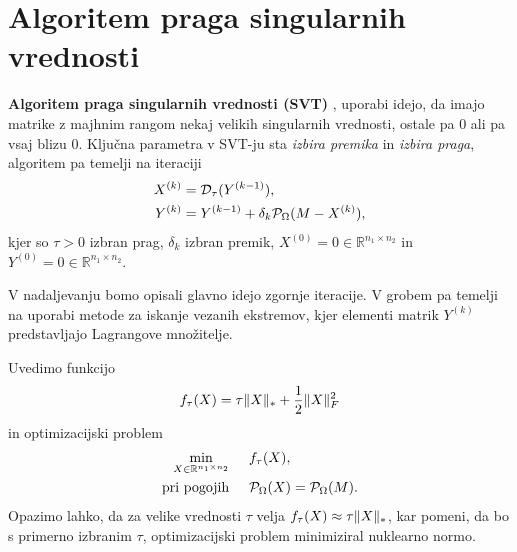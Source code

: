 \section{Algoritem praga singularnih vrednosti}
\textbf{Algoritem praga singularnih vrednosti (SVT)} \cite{CCS}, uporabi idejo, da imajo matrike z majhnim rangom nekaj velikih singularnih vrednosti, ostale pa 0 ali pa vsaj blizu 0. Ključna parametra v SVT-ju sta \textit{izbira premika} in \textit{izbira praga},  
algoritem pa temelji na iteraciji
\begin{align}
\label{2407-1910}
        X^{(k)} &= \mathcal{D}_\tau(Y^{(k-1)}), \\
        Y^{(k)} &= Y^{(k-1)} + \delta_k \mathcal{P}_\Omega(M - X^{(k)}), 
\end{align}
kjer so $\tau > 0$ izbran prag, $\delta_k$ izbran premik, $X^{(0)} = 0 \in \mathbb{R}^{n_1 \times n_2}$ in
$Y^{(0)} = 0 \in \mathbb{R}^{n_1 \times n_2}$. \cite{CCS}

V nadaljevanju bomo opisali glavno idejo zgornje iteracije. V grobem pa temelji na uporabi metode za iskanje vezanih ekstremov, kjer elementi matrik $Y^{(k)}$ predstavljajo Lagrangove množitelje. 

Uvedimo funkcijo 
\begin{align}
    \label{1007-2007}
    f_\tau(X) = \tau\lVert X\rVert_* + \frac{1}{2}\lVert X\rVert_F^2
\end{align}
in optimizacijski problem
\begin{align}
\label{2706-0957}
\begin{split}
    \min_{X\in \mathbb R^{n_1\times n_2}} & \hspace{0.5cm} f_\tau(X), \\
    \textrm{pri pogojih} & \hspace{0.5cm} \mathcal{P}_\Omega(X) = \mathcal{P}_\Omega(M).
\end{split}
\end{align}
Opazimo lahko, da za velike vrednosti $\tau$ velja $f_\tau(X) \approx \tau\lVert X\rVert_*$, kar pomeni, da bo s primerno izbranim $\tau$, optimizacijski problem minimiziral nuklearno normo.

